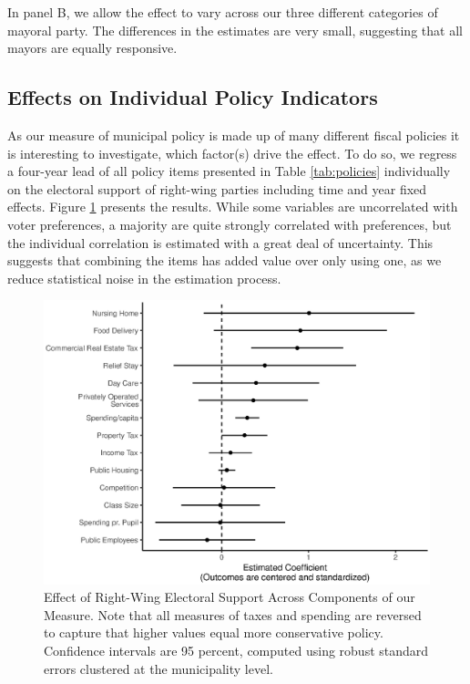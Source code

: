 \documentclass[a4paper,12pt]{article}
\begin{document}
In panel B, we allow the effect to vary across our three different categories of mayoral party. The differences in the estimates are very small, suggesting that all mayors are equally responsive.

\clearpage

\subsection{Effects on Individual Policy Indicators}
\label{item}
\setcounter{table}{0}
\setcounter{figure}{0}


As our measure of municipal policy is made up of many different fiscal policies it is interesting to investigate, which factor(s) drive the effect. To do so, we regress a four-year lead of all policy items presented in Table \ref{tab:policies} individually on the electoral support of right-wing parties including time and year fixed effects. Figure \ref{fig:item} presents the results. While some variables are uncorrelated with voter preferences, a majority are quite strongly correlated with preferences, but the individual correlation is estimated with a great deal of uncertainty. This suggests that combining the items has added value over only using one, as we reduce statistical noise in the estimation process. 

\begin{figure}[!htb]
	\centering
	\includegraphics[scale = 1]{ItemByItem_18092018.eps}
	\caption{Effect of Right-Wing Electoral Support Across Components of our Measure. Note that all measures of taxes and spending are reversed to capture that higher values equal more conservative policy. Confidence intervals are 95 percent, computed using robust standard errors clustered at the municipality level.} \label{fig:item}
\end{figure}
\clearpage



\end{document}
